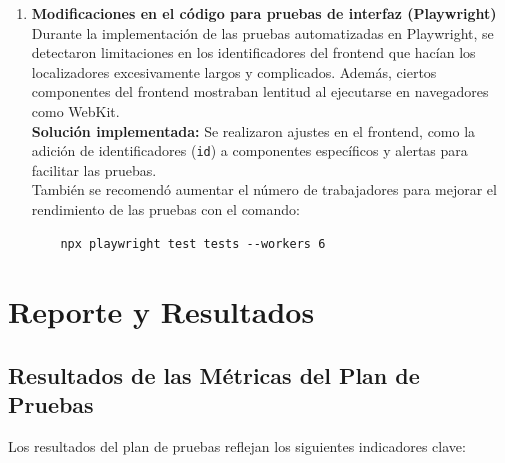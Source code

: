 \documentclass[stu, 12pt, letterpaper, donotrepeattitle, floatsintext, natbib]{apa7}
\begin{document}
\begin{enumerate}
    \item \textbf{Modificaciones en el código para pruebas de interfaz (Playwright)} \\
    Durante la implementación de las pruebas automatizadas en Playwright, se detectaron limitaciones en los identificadores del frontend que hacían los localizadores excesivamente largos y complicados. Además, ciertos componentes del frontend mostraban lentitud al ejecutarse en navegadores como WebKit. \\
    \textbf{Solución implementada:} Se realizaron ajustes en el frontend, como la adición de identificadores (\texttt{id}) a componentes específicos y alertas para facilitar las pruebas. \\
    También se recomendó aumentar el número de trabajadores para mejorar el rendimiento de las pruebas con el comando:
    \begin{verbatim}
    npx playwright test tests --workers 6
    \end{verbatim}
    
\end{enumerate}


\section{Reporte y Resultados}

\subsection{Resultados de las Métricas del Plan de Pruebas}

\noindent Los resultados del plan de pruebas reflejan los siguientes indicadores clave:
\end{document}
